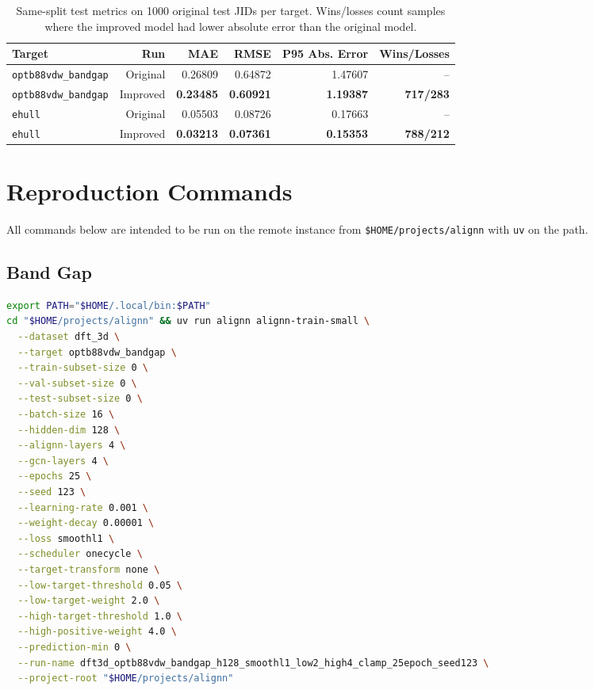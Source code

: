 \documentclass[11pt]{article}
\begin{document}
\begin{table}[h]
\centering
\begin{tabular}{lrrrrr}
\toprule
Target & Run & MAE & RMSE & P95 Abs. Error & Wins/Losses \\
\midrule
\texttt{optb88vdw\_bandgap} & Original & 0.26809 & 0.64872 & 1.47607 & -- \\
\texttt{optb88vdw\_bandgap} & Improved & \textbf{0.23485} & \textbf{0.60921} & \textbf{1.19387} & \textbf{717/283} \\
\texttt{ehull} & Original & 0.05503 & 0.08726 & 0.17663 & -- \\
\texttt{ehull} & Improved & \textbf{0.03213} & \textbf{0.07361} & \textbf{0.15353} & \textbf{788/212} \\
\bottomrule
\end{tabular}
\caption{Same-split test metrics on 1000 original test JIDs per target.  Wins/losses count samples where the improved model had lower absolute error than the original model.}
\end{table}

\section{Reproduction Commands}

All commands below are intended to be run on the remote instance from \texttt{\$HOME/projects/alignn} with \texttt{uv} on the path.

\subsection{Band Gap}

\begin{lstlisting}[language=bash]
export PATH="$HOME/.local/bin:$PATH"
cd "$HOME/projects/alignn" && uv run alignn alignn-train-small \
  --dataset dft_3d \
  --target optb88vdw_bandgap \
  --train-subset-size 0 \
  --val-subset-size 0 \
  --test-subset-size 0 \
  --batch-size 16 \
  --hidden-dim 128 \
  --alignn-layers 4 \
  --gcn-layers 4 \
  --epochs 25 \
  --seed 123 \
  --learning-rate 0.001 \
  --weight-decay 0.00001 \
  --loss smoothl1 \
  --scheduler onecycle \
  --target-transform none \
  --low-target-threshold 0.05 \
  --low-target-weight 2.0 \
  --high-target-threshold 1.0 \
  --high-positive-weight 4.0 \
  --prediction-min 0 \
  --run-name dft3d_optb88vdw_bandgap_h128_smoothl1_low2_high4_clamp_25epoch_seed123 \
  --project-root "$HOME/projects/alignn"
\end{lstlisting}
\end{document}
